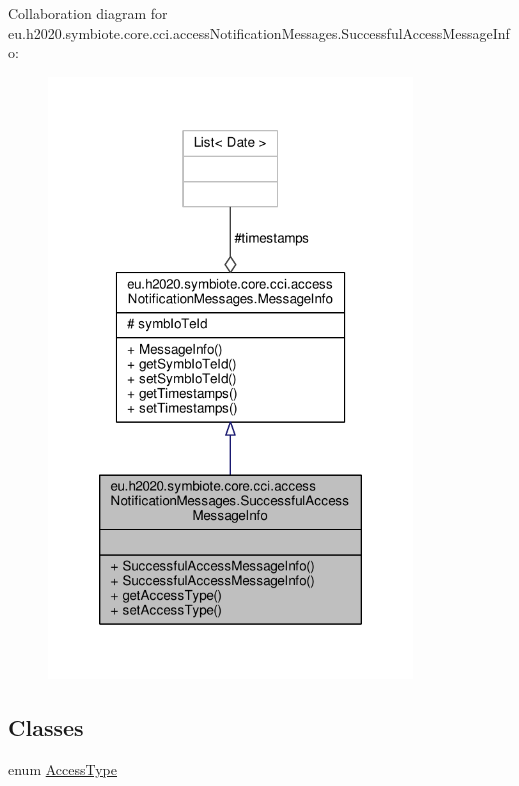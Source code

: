 Collaboration diagram for eu.\+h2020.\+symbiote.\+core.\+cci.\+access\+Notification\+Messages.\+Successful\+Access\+Message\+Info\+:\nopagebreak
\begin{figure}[H]
\begin{center}
\leavevmode
\includegraphics[width=274pt]{classeu_1_1h2020_1_1symbiote_1_1core_1_1cci_1_1accessNotificationMessages_1_1SuccessfulAccessMessageInfo__coll__graph}
\end{center}
\end{figure}
\subsection*{Classes}
\begin{DoxyCompactItemize}
\item 
enum \hyperlink{enumeu_1_1h2020_1_1symbiote_1_1core_1_1cci_1_1accessNotificationMessages_1_1SuccessfulAccessMessageInfo_1_1AccessType}{Access\+Type}
\end{DoxyCompactItemize}
